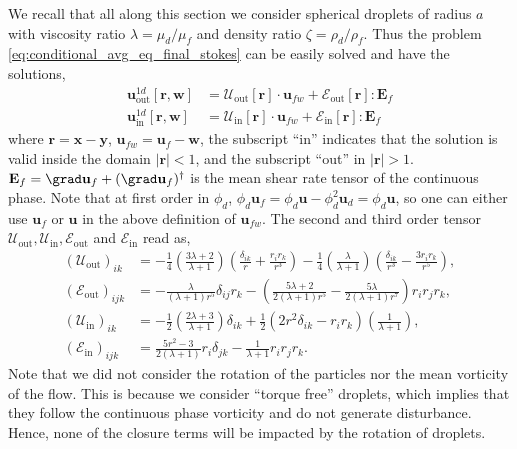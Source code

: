 We recall that all along this section we consider spherical droplets of radius $a$ with viscosity ratio $\lambda = \mu_d /\mu_f$ and density ratio $\zeta =\rho_d /\rho_f$. 
Thus the problem \ref{eq:conditional_avg_eq_final_stokes} can be easily solved and have the solutions, 
\begin{align}
    \label{eq:singularity_solution_out}
    \textbf{u}_\text{out}^{1d}[\textbf{r},\textbf{w}]
    &= 
    \mathcal{U}_\text{out}[\textbf{r}] \cdot \textbf{u}_{fw}
    + \mathcal{E}_\text{out}[\textbf{r}]: \textbf{E}_{f}\\
    \textbf{u}_\text{in}^{1d}[\textbf{r},\textbf{w}]
    &= 
    \mathcal{U}_\text{in}[\textbf{r}] \cdot \textbf{u}_{fw}
    + \mathcal{E}_\text{in}[\textbf{r}] : \textbf{E}_{f}
    \label{eq:singularity_solution_in}
\end{align}
where $\textbf{r} = \textbf{x} - \textbf{y}$, $\textbf{u}_{fw} = \textbf{u}_f - \textbf{w}$, the subscript ``in'' indicates that the solution is valid inside the domain $|\textbf{r}| <1$, and the subscript ``out'' in $|\textbf{r}|>1$. 
$\textbf{E}_f = \grad \textbf{u}_f + (\grad \textbf{u}_f)^\dagger$ is the mean shear rate tensor of the continuous phase. 
Note that at first order in $\phi_d$, $\phi_d\textbf{u}_f =\phi_d\textbf{u} - \phi_d^2 \textbf{u}_d = \phi_d\textbf{u}$, so one can either use $\textbf{u}_f$ or $\textbf{u}$ in the above definition of $\textbf{u}_{fw}$. 
The second and third order tensor $\mathcal{U}_\text{out},\mathcal{U}_\text{in},\mathcal{E}_\text{out}$ and $\mathcal{E}_\text{in}$ read as, 
\begin{align}
    (\mathcal{U}_{\text{out}})_{ik} &= 
    -\frac{1}{4}\left(\frac{3\lambda + 2}{\lambda +1}\right)
    \left(\frac{\delta_{ik}}{r} + \frac{r_ir_k}{r^3}\right) 
    -\frac{1}{4}\left(\frac{\lambda}{\lambda +1}\right)
    \left(\frac{\delta_{ik}}{r^3} - \frac{3r_ir_k}{r^5}\right),  \\
    (\mathcal{E}_{\text{out}})_{ijk}
    &=
    -\frac{\lambda}{(\lambda + 1)r^5} \delta_{ij}r_k
    -\left(\frac{5\lambda +2}{2(\lambda +1 )r^5} - \frac{5\lambda}{2(\lambda+1)r^7}\right) r_ir_jr_k,\\
    (\mathcal{U}_\text{in})_{ik}  &= 
    -\frac{1}{2}\left(\frac{2\lambda +3}{\lambda +1}\right)\delta_{ik}
    +\frac{1}{2} (2r^2 \delta_{ik} - r_ir_k)
    \left(\frac{1}{\lambda +1}\right),\\
    (\mathcal{E}_\text{in})_{ijk}
    &=
    \frac{5r^2 -3}{2(\lambda +1)} r_i\delta_{jk}
    - \frac{1}{\lambda+1}r_ir_jr_k. 
\end{align}
Note that we did not consider the rotation of the particles nor the mean vorticity of the flow. 
This is because we consider ``torque free'' droplets, which implies that they follow the continuous phase vorticity and do not generate disturbance. 
Hence, none of the closure terms will be impacted by the rotation of droplets. 

